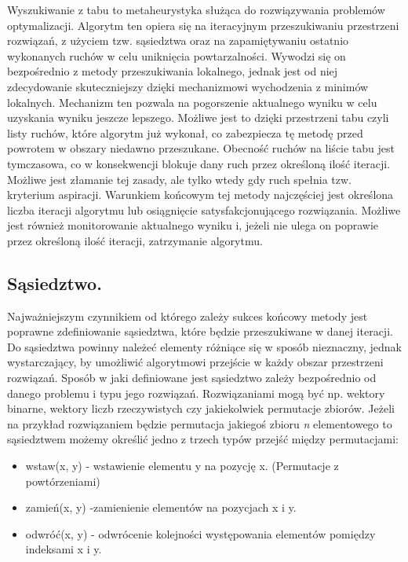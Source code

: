 Wyszukiwanie z tabu to metaheurystyka służąca do rozwiązywania problemów optymalizacji. Algorytm ten opiera się na iteracyjnym przeszukiwaniu przestrzeni rozwiązań, z użyciem tzw. sąsiedztwa oraz na zapamiętywaniu ostatnio wykonanych ruchów w celu uniknięcia powtarzalności. Wywodzi się on bezpośrednio z metody przeszukiwania lokalnego, jednak jest od niej zdecydowanie skuteczniejszy dzięki mechanizmowi wychodzenia z minimów lokalnych. Mechanizm ten pozwala na pogorszenie aktualnego wyniku w celu uzyskania wyniku jeszcze lepszego. Możliwe jest to dzięki przestrzeni tabu czyli listy ruchów, które algorytm już wykonał, co zabezpiecza tę metodę przed powrotem w obszary niedawno przeszukane. Obecność ruchów na liście tabu jest tymczasowa, co w konsekwencji blokuje dany ruch przez określoną ilość iteracji. Możliwe jest złamanie tej zasady, ale tylko wtedy gdy ruch spełnia tzw. kryterium aspiracji. Warunkiem końcowym tej metody najczęściej jest określona liczba iteracji algorytmu lub osiągnięcie satysfakcjonującego rozwiązania. Możliwe jest również monitorowanie aktualnego wyniku i, jeżeli nie ulega on poprawie przez określoną ilość iteracji, zatrzymanie algorytmu.

\subsection{Sąsiedztwo.}

Najważniejszym czynnikiem od którego zależy sukces końcowy metody jest poprawne zdefiniowanie sąsiedztwa, które będzie przeszukiwane w danej iteracji. Do sąsiedztwa powinny należeć elementy różniące się w sposób nieznaczny, jednak wystarczający, by umożliwić algorytmowi przejście w każdy obszar przestrzeni rozwiązań. Sposób w jaki definiowane jest sąsiedztwo zależy bezpośrednio od danego problemu i typu jego rozwiązań. Rozwiązaniami mogą być np. wektory binarne, wektory liczb rzeczywistych czy jakiekolwiek permutacje zbiorów. Jeżeli na przykład rozwiązaniem będzie permutacja jakiegoś zbioru \textit{n} elementowego to sąsiedztwem możemy określić jedno z trzech typów przejść między permutacjami:

\begin{itemize}
	\item wstaw(x, y) - wstawienie elementu y na pozycję x. (Permutacje z powtórzeniami)
	\item zamień(x, y) -zamienienie elementów na pozycjach x i y.
	\item odwróć(x, y) - odwrócenie kolejności występowania elementów pomiędzy indeksami x i y.
\end{itemize}

